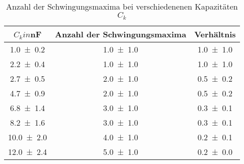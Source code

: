 \begin{table} 
\centering 
\caption{ Anzahl der Schwingungsmaxima bei verschiedenenen Kapazitäten $C_k$} 
\label{teila_n_ck} 
\begin{tabular}{S S S } 
\toprule  
{$C_k in $\si{\nano\farad}$$} & {Anzahl der Schwingungsmaxima} & {Verhältnis}  \\ 
\midrule  
 \num{1.0\pm0.2} & \num{1.0\pm1.0} & \num{1.0\pm1.0}\\ 
\num{2.2\pm0.4} & \num{1.0\pm1.0} & \num{1.0\pm1.0}\\ 
\num{2.7\pm0.5} & \num{2.0\pm1.0} & \num{0.5\pm0.2}\\ 
\num{4.7\pm0.9} & \num{2.0\pm1.0} & \num{0.5\pm0.2}\\ 
\num{6.8\pm1.4} & \num{3.0\pm1.0} & \num{0.3\pm0.1}\\ 
\num{8.2\pm1.6} & \num{3.0\pm1.0} & \num{0.3\pm0.1}\\ 
\num{10.0\pm2.0} & \num{4.0\pm1.0} & \num{0.2\pm0.1}\\ 
\num{12.0\pm2.4} & \num{5.0\pm1.0} & \num{0.2\pm0.0}\\ 
\bottomrule 
\end{tabular} 
\end{table}